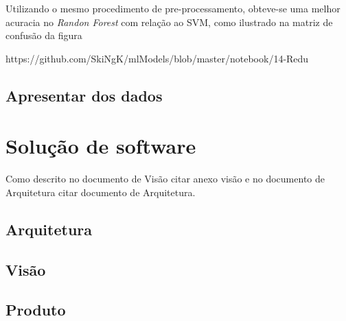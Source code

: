 Utilizando o mesmo procedimento de pre-processamento, obteve-se uma melhor acuracia no \textit{Randon Forest} com relação ao SVM, como ilustrado na matriz de confusão da figura {https://github.com/SkiNgK/mlModels/blob/master/notebook/14-Redu%

\subsection{Apresentar dos dados}

\section{Solução de software}
Como descrito no documento de Visão {citar anexo visão} e no documento de Arquitetura { citar documento de Arquitetura}.
\subsection{Arquitetura}

\subsection{Visão}

\subsection{Produto}



}
